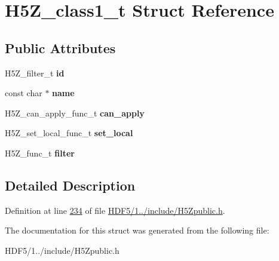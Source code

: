 \hypertarget{struct_h5_z__class1__t}{}\section{H5\+Z\+\_\+class1\+\_\+t Struct Reference}
\label{struct_h5_z__class1__t}
\subsection*{Public Attributes}
\begin{DoxyCompactItemize}
\item 
\mbox{\label{struct_h5_z__class1__t_a846132f1c938a07da9350f242b507997}} 
H5\+Z\+\_\+filter\+\_\+t {\bfseries id}
\item 
\mbox{\label{struct_h5_z__class1__t_a72f5953e0dfb59a0e7a211cee79ab4f9}} 
const char $\ast$ {\bfseries name}
\item 
\mbox{\label{struct_h5_z__class1__t_ad3abce5ede7ada70525745d8f3514323}} 
H5\+Z\+\_\+can\+\_\+apply\+\_\+func\+\_\+t {\bfseries can\+\_\+apply}
\item 
\mbox{\label{struct_h5_z__class1__t_af92d63a5d2eac4107ba88dceefd43627}} 
H5\+Z\+\_\+set\+\_\+local\+\_\+func\+\_\+t {\bfseries set\+\_\+local}
\item 
\mbox{\label{struct_h5_z__class1__t_a3b9c7b5abf8ef65fc3d1ecebaace79c1}} 
H5\+Z\+\_\+func\+\_\+t {\bfseries filter}
\end{DoxyCompactItemize}


\subsection{Detailed Description}


Definition at line \hyperlink{_h_d_f5_21_810_81_2include_2_h5_zpublic_8h_source_l00234}{234} of file \hyperlink{_h_d_f5_21_810_81_2include_2_h5_zpublic_8h_source}{H\+D\+F5/1../include/\+H5\+Zpublic.\+h}.



The documentation for this struct was generated from the following file\+:\begin{DoxyCompactItemize}
\item 
H\+D\+F5/1../include/\+H5\+Zpublic.\+h\end{DoxyCompactItemize}

